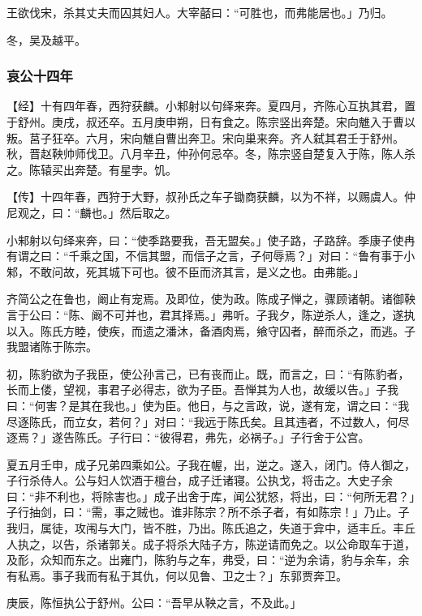 \documentclass[]{article}
\begin{document}
王欲伐宋，杀其丈夫而囚其妇人。大宰嚭曰：``可胜也，而弗能居也。」乃归。

冬，吴及越平。

\hypertarget{header-n3190}{%
\subsubsection{哀公十四年}\label{header-n3190}}

【经】十有四年春，西狩获麟。小邾射以句绎来奔。夏四月，齐陈心互执其君，置于舒州。庚戌，叔还卒。五月庚申朔，日有食之。陈宗竖出奔楚。宋向魋入于曹以叛。莒子狂卒。六月，宋向魋自曹出奔卫。宋向巢来奔。齐人弑其君壬于舒州。秋，晋赵鞅帅师伐卫。八月辛丑，仲孙何忌卒。冬，陈宗竖自楚复入于陈，陈人杀之。陈辕买出奔楚。有星孛。饥。

【传】十四年春，西狩于大野，叔孙氏之车子锄商获麟，以为不祥，以赐虞人。仲尼观之，曰：``麟也。」然后取之。

小邾射以句绎来奔，曰：``使季路要我，吾无盟矣。」使子路，子路辞。季康子使冉有谓之曰：``千乘之国，不信其盟，而信子之言，子何辱焉？」对曰：``鲁有事于小邾，不敢问故，死其城下可也。彼不臣而济其言，是义之也。由弗能。」

齐简公之在鲁也，阚止有宠焉。及即位，使为政。陈成子惮之，骤顾诸朝。诸御鞅言于公曰：``陈、阚不可并也，君其择焉。」弗听。子我夕，陈逆杀人，逢之，遂执以入。陈氏方睦，使疾，而遗之潘沐，备酒肉焉，飨守囚者，醉而杀之，而逃。子我盟诸陈于陈宗。

初，陈豹欲为子我臣，使公孙言己，已有丧而止。既，而言之，曰：``有陈豹者，长而上偻，望视，事君子必得志，欲为子臣。吾惮其为人也，故缓以告。」子我曰：``何害？是其在我也。」使为臣。他日，与之言政，说，遂有宠，谓之曰：``我尽逐陈氏，而立女，若何？」对曰：``我远于陈氏矣。且其违者，不过数人，何尽逐焉？」遂告陈氏。子行曰：``彼得君，弗先，必祸子。」子行舍于公宫。

夏五月壬申，成子兄弟四乘如公。子我在幄，出，逆之。遂入，闭门。侍人御之，子行杀侍人。公与妇人饮酒于檀台，成子迁诸寝。公执戈，将击之。大史子余曰：``非不利也，将除害也。」成子出舍于库，闻公犹怒，将出，曰：``何所无君？」子行抽剑，曰：``需，事之贼也。谁非陈宗？所不杀子者，有如陈宗！」乃止。子我归，属徒，攻闱与大门，皆不胜，乃出。陈氏追之，失道于弇中，适丰丘。丰丘人执之，以告，杀诸郭关。成子将杀大陆子方，陈逆请而免之。以公命取车于道，及耏，众知而东之。出雍门，陈豹与之车，弗受，曰：``逆为余请，豹与余车，余有私焉。事子我而有私于其仇，何以见鲁、卫之士？」东郭贾奔卫。

庚辰，陈恒执公于舒州。公曰：``吾早从鞅之言，不及此。」
\end{document}
